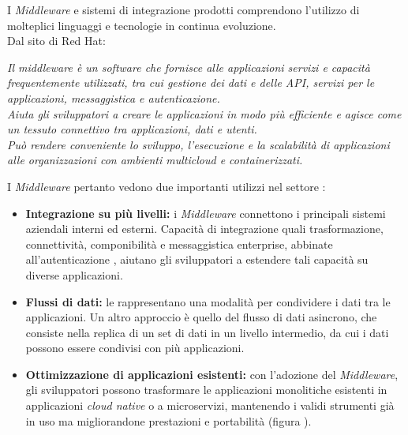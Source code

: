 I \textit{Middleware} e sistemi di integrazione prodotti comprendono l'utilizzo di molteplici linguaggi e tecnologie in continua evoluzione.\\
Dal sito di Red Hat:
\begin{displayquote}
  \textit{Il middleware è un software che fornisce alle applicazioni servizi e capacità frequentemente utilizzati, tra cui gestione dei dati e delle API, servizi per le applicazioni, messaggistica e autenticazione.\\
  Aiuta gli sviluppatori a creare le applicazioni in modo più efficiente e agisce come un tessuto connettivo tra applicazioni, dati e utenti.\\
  Può rendere conveniente lo sviluppo, l'esecuzione e la scalabilità di applicazioni alle organizzazioni con ambienti multicloud e containerizzati.}
\end{displayquote}
\noindent
I \textit{Middleware} pertanto vedono due importanti utilizzi nel settore :
\begin{itemize}
  \item \textbf{Integrazione su più livelli:} i \textit{Middleware} connettono i principali sistemi aziendali interni ed esterni. Capacità di integrazione quali trasformazione, connettività, componibilità e messaggistica enterprise, abbinate all'autenticazione , aiutano gli sviluppatori a estendere tali capacità su diverse applicazioni.
  \item \textbf{Flussi di dati:} le  rappresentano una modalità per condividere i dati tra le applicazioni. Un altro approccio è quello del flusso di dati asincrono, che consiste nella replica di un set di dati in un livello intermedio, da cui i dati possono essere condivisi con più applicazioni.
  \item \textbf{Ottimizzazione di applicazioni esistenti:} con l'adozione del \textit{Middleware}, gli sviluppatori possono trasformare le applicazioni monolitiche esistenti in applicazioni \textit{cloud native} o a microservizi, mantenendo i validi strumenti già in uso ma migliorandone prestazioni e portabilità (figura \thefigure).
\end{itemize}

